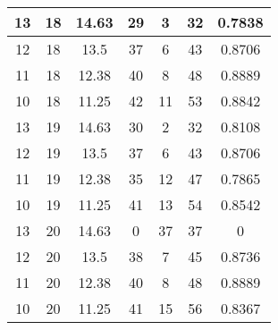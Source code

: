 \documentclass[letterpaper, 12pt]{article}
\begin{document}
\begin{longtable}{|c|c|c|c|c|c|c|}
\hline
13 & 18 & 14.63 & 29 & 3 & 32 & 0.7838 \\
\hline
12 & 18 & 13.5 & 37 & 6 & 43 & 0.8706 \\
\hline
11 & 18 & 12.38 & 40 & 8 & 48 & 0.8889 \\
\hline
10 & 18 & 11.25 & 42 & 11 & 53 & 0.8842 \\
\hline
13 & 19 & 14.63 & 30 & 2 & 32 & 0.8108 \\
\hline
12 & 19 & 13.5 & 37 & 6 & 43 & 0.8706 \\
\hline
11 & 19 & 12.38 & 35 & 12 & 47 & 0.7865 \\
\hline
10 & 19 & 11.25 & 41 & 13 & 54 & 0.8542 \\
\hline
13 & 20 & 14.63 & 0 & 37 & 37 & 0 \\
\hline
12 & 20 & 13.5 & 38 & 7 & 45 & 0.8736 \\
\hline
11 & 20 & 12.38 & 40 & 8 & 48 & 0.8889 \\
\hline
10 & 20 & 11.25 & 41 & 15 & 56 & 0.8367 \\
\hline
\end{longtable}
\end{document}
